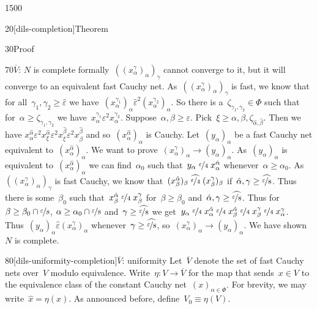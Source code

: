 \begin{parsec}{1500}
\begin{point}{20}[dils-completion]{Theorem}
\begin{point}{30}{Proof}
\begin{point}{70}{$\overline{V}$: $N$ is complete}
    formally~$((x^\gamma_\alpha)_\alpha)_\gamma$
    cannot converge to it,
    but it will converge to an equivalent fast Cauchy net.
As~$((x^\gamma_\alpha)_\alpha)_\gamma$
    is fast,
    we know that for all~$\gamma_1,\gamma_2 \geq \hat\varepsilon$
we have~$
(x^{\gamma_1}_\alpha)_\alpha \mathrel{\hat\varepsilon^2}
        (x^{\gamma_2}_\alpha)_\alpha$.
So there is a~$\zeta_{\gamma_1,\gamma_2} \in \Phi$
such that for~$\alpha \geq \zeta_{\gamma_1,\gamma_2}$
    we have~$x^{\gamma_1}_\alpha
        \mathrel{\varepsilon^2}
        x^{\gamma_2}_\alpha$.
Suppose~$\alpha,\beta \geq \varepsilon$.
Pick~$\xi \geq \alpha,\beta,\zeta_{\hat\alpha,\hat\beta}$.
Then we have $ x^{\hat{\alpha}}_\alpha
            \mathrel{\varepsilon^2}
        x^{\hat{\alpha}}_\xi
            \mathrel{\varepsilon^2}
        x^{\hat{\beta}}_\xi
            \mathrel{\varepsilon^2}
            x^{\hat{\beta}}_\beta$ and so~$(x_\alpha^{\hat\alpha})_\alpha$
            is Cauchy.
Let~$(y_\alpha)_\alpha$ be a fast Cauchy net equivalent
to~$(x^{\hat\alpha}_\alpha)_\alpha$.
We want to prove~$(x^\gamma_\alpha)_\alpha \to (y_\alpha)_\alpha$.
As~$(y_\alpha)_\alpha$ is equivalent to~$(x^{\hat\alpha}_\alpha)_\alpha$
    we can find~$\alpha_0$
    such that~$y_\alpha \mathrel{\nicefrac{\varepsilon}{4}} x^{\hat\alpha}_\alpha$
    whenever~$\alpha \geq \alpha_0$.
As~$((x^\gamma_\alpha)_\alpha)_\gamma$
is fast Cauchy,
we know that~$(x^{\hat\alpha}_\beta)_\beta
\mathrel{\widehat{\nicefrac{\varepsilon}{4}}}
(x^\gamma_\beta)_\beta $
if~$\hat{\alpha}, \gamma \geq \widehat{\nicefrac{\varepsilon}{8}}$.
Thus there is some~$\beta_0$ such
that~$x^{\hat\alpha}_\beta
\mathrel{\nicefrac{\varepsilon}{4}}
x^\gamma_\beta $
for~$\beta \geq \beta_0$
and~$\hat{\alpha}, \gamma \geq \widehat{\nicefrac{\varepsilon}{8}}$.
Thus for~$\beta \geq \beta_0 \cap \nicefrac{\varepsilon}{8}$,
$\alpha \geq \alpha_0 \cap \nicefrac{\varepsilon}{8}$
and~$\gamma \geq \widehat{\nicefrac{\varepsilon}{8}}$
we get~$y_\alpha
\mathrel{\nicefrac{\varepsilon}{4}}
x^{\hat{\alpha}}_\alpha
\mathrel{\nicefrac{\varepsilon}{4}}
x^{\hat{\alpha}}_\beta
\mathrel{\nicefrac{\varepsilon}{4}}
x^\gamma_\beta
\mathrel{\nicefrac{\varepsilon}{4}}
x^\gamma_\alpha$.
Thus~$(y_\alpha)_\alpha \mathrel{\hat\varepsilon} (x^\gamma_\alpha)_\alpha$
whenever~$\gamma \geq \widehat{\nicefrac{\varepsilon}{8}}$,
so~$(x^\gamma_\alpha)_\alpha \to (y_\alpha)_\alpha$.
We have shown~$N$ is complete.
\end{point}
\begin{point}{80}[dils-uniformity-completion]{$\overline{V}$: uniformity}%
Let~$\overline{V}$ denote the set of fast Cauchy nets over~$V$
    modulo equivalence.
Write~$\eta\colon V \to \overline{V}$
for the map that sends~$x \in V$
to the equivalence class of the constant Cauchy net~$(x)_{\alpha \in \Phi}$.
For brevity, we may write~$\hat{x} = \eta(x)$.
As announced before, define~$V_0 \equiv \eta(V)$.


\end{point}
\end{point}
\end{point}
\end{parsec}
